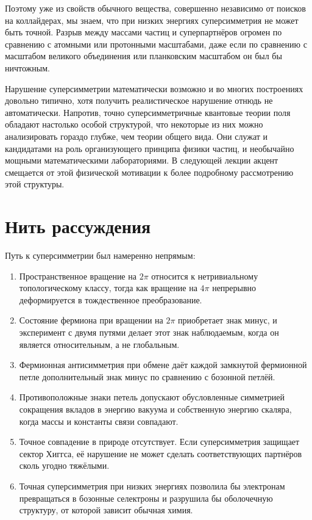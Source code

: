 Поэтому уже из свойств обычного вещества, совершенно независимо от поисков на коллайдерах, мы знаем, что при низких энергиях суперсимметрия не может быть точной. Разрыв между массами частиц и суперпартнёров огромен по сравнению с атомными или протонными масштабами, даже если по сравнению с масштабом великого объединения или планковским масштабом он был бы ничтожным.

\begin{classroomqa}
\end{classroomqa}

Нарушение суперсимметрии математически возможно и во многих построениях довольно типично, хотя получить реалистическое нарушение отнюдь не автоматически. Напротив, точно суперсимметричные квантовые теории поля обладают настолько особой структурой, что некоторые из них можно анализировать гораздо глубже, чем теории общего вида. Они служат и кандидатами на роль организующего принципа физики частиц, и необычайно мощными математическими лабораториями. В следующей лекции акцент смещается от этой физической мотивации к более подробному рассмотрению этой структуры.

\section{Нить рассуждения}

Путь к суперсимметрии был намеренно непрямым:
\begin{enumerate}
\item Пространственное вращение на \(2\pi\) относится к нетривиальному топологическому классу, тогда как вращение на \(4\pi\) непрерывно деформируется в тождественное преобразование.
\item Состояние фермиона при вращении на \(2\pi\) приобретает знак минус, и эксперимент с двумя путями делает этот знак наблюдаемым, когда он является относительным, а не глобальным.
\item Фермионная антисимметрия при обмене даёт каждой замкнутой фермионной петле дополнительный знак минус по сравнению с бозонной петлёй.
\item Противоположные знаки петель допускают обусловленные симметрией сокращения вкладов в энергию вакуума и собственную энергию скаляра, когда массы и константы связи совпадают.
\item Точное совпадение в природе отсутствует. Если суперсимметрия защищает сектор Хиггса, её нарушение не может сделать соответствующих партнёров сколь угодно тяжёлыми.
\item Точная суперсимметрия при низких энергиях позволила бы электронам превращаться в бозонные селектроны и разрушила бы оболочечную структуру, от которой зависит обычная химия.
\end{enumerate}

